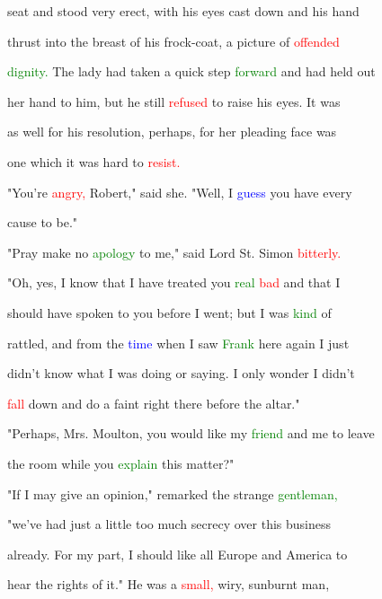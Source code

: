  seat and stood very erect, with his eyes cast down and his hand

 thrust into the breast of his frock-coat, a picture of \textcolor{red}{offended}

 \textcolor{green}{dignity.} The lady had taken a quick step \textcolor{green}{forward} and had held out

 her hand to him, but he still \textcolor{red}{refused} to raise his eyes. It was

 as well for his resolution, perhaps, for her pleading face was

 one which it was hard to \textcolor{red}{resist.}



 "You're \textcolor{red}{angry,} Robert," said she. "Well, I \textcolor{blue}{guess} you have every

 cause to be."



 \textcolor{BurntOrange}{"Pray} make no \textcolor{green}{apology} to me," said \textcolor{BurntOrange}{Lord} St. Simon \textcolor{red}{bitterly.}



 "Oh, yes, I know that I have \textcolor{BurntOrange}{treated} you \textcolor{green}{real} \textcolor{red}{bad} and that I

 should have spoken to you before I went; but I was \textcolor{green}{kind} of

 rattled, and from the \textcolor{blue}{time} when I saw \textcolor{green}{Frank} here again I just

 didn't know what I was doing or saying. I only wonder I didn't

 \textcolor{red}{fall} down and do a faint right there before the altar."



 "Perhaps, Mrs. Moulton, you would like my \textcolor{green}{friend} and me to \textcolor{BurntOrange}{leave}

 the room while you \textcolor{green}{explain} this matter?"



 "If I may give an opinion," remarked the strange \textcolor{green}{gentleman,}

 "we've had just a little too much \textcolor{BurntOrange}{secrecy} over this business

 already. For my part, I should like all Europe and America to

 hear the rights of it." He was a \textcolor{red}{small,} wiry, sunburnt man,

